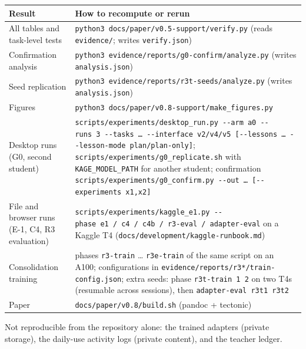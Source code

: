 \documentclass[
  10pt,
]{article}
\newcounter{none} %
\begin{document}
{\def\LTcaptype{none} %
\begin{longtable}[]{@{}
  >{\raggedright\arraybackslash}p{}
  >{\raggedright\arraybackslash}p{}@{}}
\toprule\noalign{}
\begin{minipage}[b]{\linewidth}\raggedright
Result
\end{minipage} & \begin{minipage}[b]{\linewidth}\raggedright
How to recompute or rerun
\end{minipage} \\
\midrule\noalign{}
\endhead
\bottomrule\noalign{}
\endlastfoot
All tables and task-level tests &
\texttt{python3\ docs/paper/v0.5-support/verify.py} (reads
\texttt{evidence/}; writes \texttt{verify.json}) \\
Confirmation analysis &
\texttt{python3\ evidence/reports/g0-confirm/analyze.py} (writes
\texttt{analysis.json}) \\
Seed replication &
\texttt{python3\ evidence/reports/r3t-seeds/analyze.py} (writes
\texttt{analysis.json}) \\
Figures & \texttt{python3\ docs/paper/v0.8-support/make\_figures.py} \\
Desktop runs (G0, second student) &
\texttt{scripts/experiments/desktop\_run.py\ -\/-arm\ a0\ -\/-runs\ 3\ -\/-tasks\ …\ -\/-interface\ v2/v4/v5\ {[}-\/-lessons\ …\ -\/-lesson-mode\ plan/plan-only{]}};
\texttt{scripts/experiments/g0\_replicate.sh} with
\texttt{KAGE\_MODEL\_PATH} for another student; confirmation
\texttt{scripts/experiments/g0\_confirm.py\ -\/-out\ …\ {[}-\/-experiments\ x1,x2{]}} \\
File and browser runs (E-1, C4, R3 evaluation) &
\texttt{scripts/experiments/kaggle\_e1.py\ -\/-phase\ e1\ /\ c4\ /\ c4b\ /\ r3-eval\ /\ adapter-eval}
on a Kaggle T4 (\texttt{docs/development/kaggle-runbook.md}) \\
Consolidation training & phases \texttt{r3-train} \ldots{}
\texttt{r3e-train} of the same script on an A100; configurations in
\texttt{evidence/reports/r3*/train-config.json}; extra seeds: phase
\texttt{r3t-train\ 1\ 2} on two T4s (resumable across sessions), then
\texttt{adapter-eval\ r3t1\ r3t2} \\
Paper & \texttt{docs/paper/v0.8/build.sh} (pandoc + tectonic) \\
\end{longtable}
}

Not reproducible from the repository alone: the trained adapters
(private storage), the daily-use activity logs (private content), and
the teacher ledger.
\end{document}
